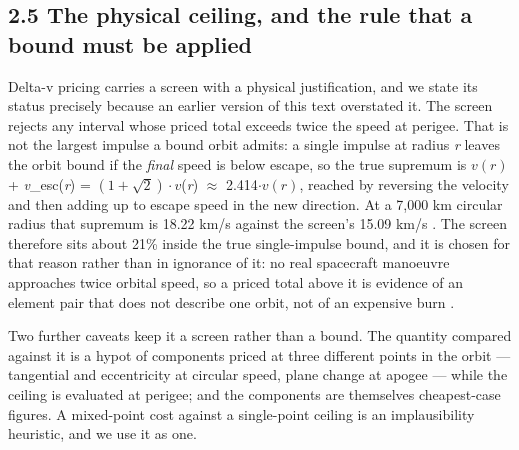 \documentclass[11pt]{article}
\begin{document}
\subsection*{2.5 The physical ceiling, and the rule that a bound must be applied}

Delta-v pricing carries a screen with a physical justification, and we state its status precisely because an earlier version of this text overstated it. The screen rejects any interval whose priced total exceeds twice the speed at perigee. That is not the largest impulse a bound orbit admits: a single impulse at radius \emph{r} leaves the orbit bound if the \emph{final} speed is below escape, so the true supremum is $v(r)$ + \emph{v}\_esc(\emph{r}) = $(1 + \sqrt{2})\cdot v$(\emph{r}) $\approx$ 2.414$\cdot$$v(r)$, reached by reversing the velocity and then adding up to escape speed in the new direction. At a 7,000 km circular radius that supremum is 18.22 km/s against the screen's 15.09 km/s%
. The screen therefore sits about 21\% inside the true single-impulse bound, and it is chosen for that reason rather than in ignorance of it: no real spacecraft manoeuvre approaches twice orbital speed, so a priced total above it is evidence of an element pair that does not describe one orbit, not of an expensive burn%
.

Two further caveats keep it a screen rather than a bound. The quantity compared against it is a hypot of components priced at three different points in the orbit --- tangential and eccentricity at circular speed, plane change at apogee --- while the ceiling is evaluated at perigee; and the components are themselves cheapest-case figures. A mixed-point cost against a single-point ceiling is an implausibility heuristic, and we use it as one.
\end{document}
